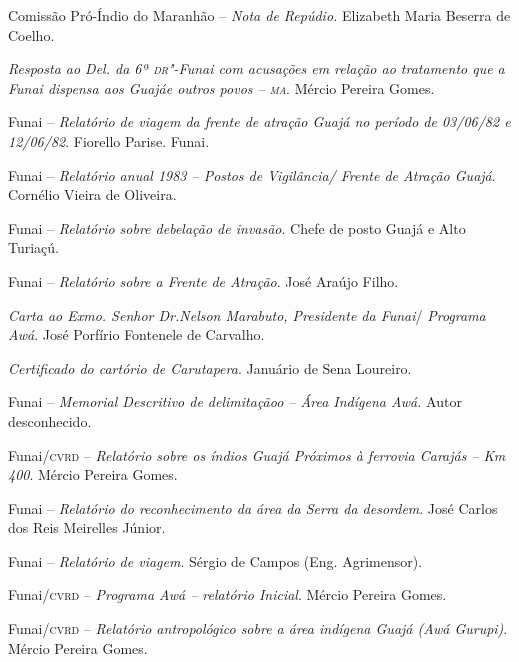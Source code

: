 \begin{itemize}
{\item[1982] Comissão Pró-Índio do Maranhão -- \emph{Nota de Repúdio.}
Elizabeth Maria Beserra de Coelho.

\item[1982] \emph{Resposta ao Del. da 6ª \textsc{dr}"-Funai com acusações em
relação ao tratamento que a Funai dispensa aos Guajáe outros povos --
\textsc{ma}}. Mércio Pereira Gomes.

\item[1983] Funai -- \emph{Relatório de viagem da frente de atração
Guajá no período de 03/06/82 e 12/06/82}. Fiorello Parise. Funai.

\item[1983] Funai -- \emph{Relatório anual 1983 -- Postos de
Vigilância/ Frente de Atração Guajá}. Cornélio Vieira de Oliveira.

\item[1984] Funai -- \emph{Relatório sobre debelação de invasão}.
Chefe de posto Guajá e Alto Turiaçú.

\item[1984] Funai -- \emph{Relatório sobre a Frente de Atração}. José
Araújo Filho.

\item[1984] \emph{Carta ao Exmo. Senhor Dr.Nelson Marabuto,
Presidente da Funai}/ \emph{Programa Awá}. José Porfírio Fontenele de
Carvalho.

\item[1985] \emph{Certificado do cartório de Carutapera}. Januário de
Sena Loureiro.

\item[1985] Funai -- \emph{Memorial Descritivo de delimitaçãoo --
Área Indígena Awá.} Autor desconhecido.

\item[1985] Funai/\textsc{cvrd} -- \emph{Relatório sobre os índios Guajá
Próximos à ferrovia Carajás -- Km 400}. Mércio Pereira Gomes.

\item[1985] Funai -- \emph{Relatório do reconhecimento da área da
Serra da desordem}. José Carlos dos Reis Meirelles Júnior.

\item[1985] Funai -- \emph{Relatório de viagem}. Sérgio de Campos
(Eng. Agrimensor).

\item[1985] Funai/\textsc{cvrd} -- \emph{Programa Awá -- relatório Inicial}.
Mércio Pereira Gomes.

\item[1985] Funai/\textsc{cvrd} -- \emph{Relatório antropológico sobre a área
indígena Guajá (Awá Gurupi)}. Mércio Pereira Gomes.

}
\end{itemize}
